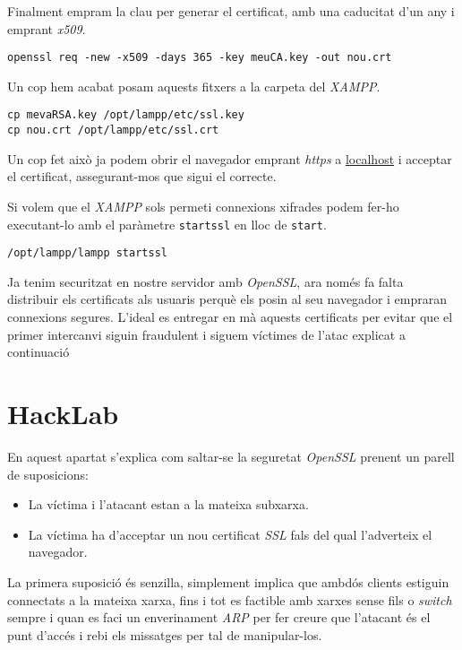 \documentclass[a4paper,11pt]{scrartcl}
\begin{document}
Finalment empram la clau per generar el certificat, amb una caducitat d'un any i emprant
\emph{x509}.

\begin{verbatim}
openssl req -new -x509 -days 365 -key meuCA.key -out nou.crt
\end{verbatim}

Un cop hem acabat posam aquests fitxers a la carpeta del \emph{XAMPP}.

\begin{verbatim}
cp mevaRSA.key /opt/lampp/etc/ssl.key
cp nou.crt /opt/lampp/etc/ssl.crt
\end{verbatim}

Un cop fet això ja podem obrir el navegador emprant \emph{https} a \href{https://localhost}{localhost}
i acceptar el certificat, assegurant-mos que sigui el correcte.

Si volem que el \emph{XAMPP} sols permeti connexions xifrades podem fer-ho executant-lo
amb el paràmetre \texttt{startssl} en lloc de \texttt{start}.

\begin{verbatim}
/opt/lampp/lampp startssl
\end{verbatim}

Ja tenim securitzat en nostre servidor amb \emph{OpenSSL}, ara només fa falta distribuir
els certificats als usuaris perquè els posin al seu navegador i empraran connexions segures.
L'ideal es entregar en mà aquests certificats per evitar que el primer intercanvi siguin
fraudulent i siguem víctimes de l'atac explicat a continuació

\section{HackLab}
En aquest apartat s'explica com saltar-se la seguretat \emph{OpenSSL} prenent un parell de suposicions:

\begin{itemize}
  \item La víctima i l'atacant estan a la mateixa subxarxa.
  \item La víctima ha d'acceptar un nou certificat \emph{SSL} fals del qual l'adverteix el navegador.
\end{itemize}

La primera suposició és senzilla, simplement implica que ambdós clients estiguin connectats
a la mateixa xarxa, fins i tot es factible amb xarxes sense fils o \emph{switch} sempre
i quan es faci un enverinament \emph{ARP} per fer creure que l'atacant és el punt d'accés
i rebi els missatges per tal de manipular-los.
\end{document}

